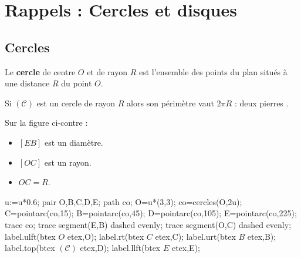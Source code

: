 \section{Rappels : Cercles et disques}
\subsection{Cercles}
\begin{definition}
    Le \textbf{cercle} de centre $O$ et de rayon $R$ est l'ensemble des points du plan situés à une distance $R$ du point $O$.
\end{definition}
\begin{propriete}[\admise]
    Si $(\mathscr C)$ est un cercle de rayon $R$ alors son périmètre vaut $2\pi R$ : \og{} deux pierres \fg{}.
\end{propriete}
\begin{exemple*1}

    \begin{minipage}{0.5\linewidth}
        Sur la figure ci-contre :
        \begin{itemize}
            \item $[EB]$ est un diamètre.
            \item $[OC]$ est un rayon.
            \item $OC=R$.
        \end{itemize}
    \end{minipage}
    \begin{minipage}{0.5\linewidth}
        \begin{center}
            \begin{Geometrie}
                u:=u*0.6; 
                pair O,B,C,D,E;
                path co;
                O=u*(3,3);
                co=cercles(O,2u);
                C=pointarc(co,15);
                B=pointarc(co,45);
                D=pointarc(co,105);
                E=pointarc(co,225);
                trace co;
                trace segment(E,B) dashed evenly;
                trace segment(O,C) dashed evenly;
                label.ulft(btex $O$ etex,O);
                label.rt(btex $C$ etex,C);
                label.urt(btex $B$ etex,B);
                label.top(btex $(\mathcal{C})$ etex,D);
                label.llft(btex $E$ etex,E);
            \end{Geometrie}
        \end{center}
    \end{minipage}
    \vspace*{-5mm}
\end{exemple*1}
